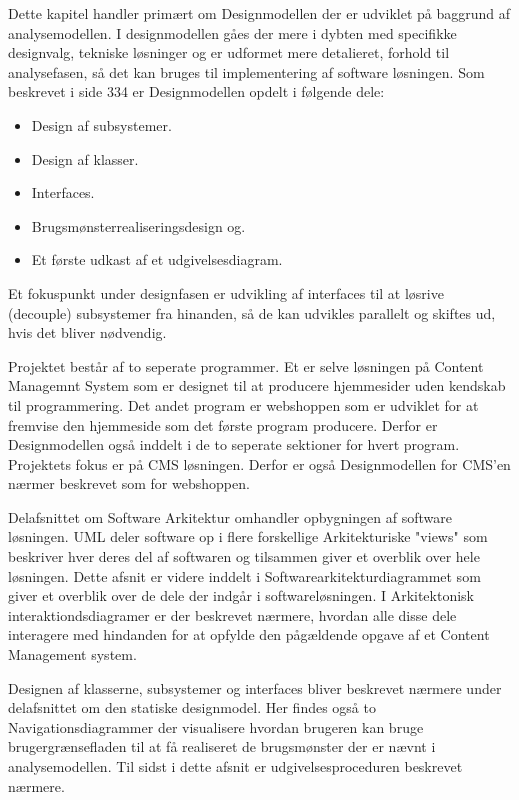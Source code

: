 Dette kapitel handler primært om Designmodellen der er udviklet på baggrund af analysemodellen. I designmodellen gåes der mere i dybten med specifikke designvalg, tekniske løsninger og er udformet mere detalieret, forhold til analysefasen, så det kan bruges til implementering af software løsningen. Som beskrevet i \cite{A&N} side 334 er Designmodellen opdelt i følgende dele:
\begin{itemize}
\item Design af subsystemer.
\item Design af klasser.
\item Interfaces.
\item Brugsmønsterrealiseringsdesign og.
\item Et første udkast af et udgivelsesdiagram.
\end{itemize}
Et fokuspunkt under designfasen er udvikling af interfaces til at løsrive (decouple) subsystemer fra hinanden, så de kan udvikles parallelt og skiftes ud, hvis det bliver nødvendig. 

Projektet består af to seperate programmer. Et er selve løsningen på Content Managemnt System som er designet til at producere hjemmesider uden kendskab til programmering. Det andet program er webshoppen som er udviklet for at fremvise den hjemmeside som det første program producere. Derfor er Designmodellen også inddelt i de to seperate sektioner for hvert program. Projektets fokus er på CMS løsningen. Derfor er også Designmodellen for CMS'en nærmer beskrevet som for webshoppen.

Delafsnittet om Software Arkitektur omhandler opbygningen af software løsningen. UML deler software op i flere forskellige Arkitekturiske "views" som beskriver hver deres del af softwaren og tilsammen giver et overblik over hele løsningen. Dette afsnit er videre inddelt i Softwarearkitekturdiagrammet som giver et overblik over de dele der indgår i softwareløsningen. I Arkitektonisk interaktiondsdiagramer er der beskrevet nærmere, hvordan alle disse dele interagere med hindanden for at opfylde den pågældende opgave af et Content Management system.

Designen af klasserne, subsystemer og interfaces bliver beskrevet nærmere under delafsnittet om den statiske designmodel. Her findes også to Navigationsdiagrammer der visualisere hvordan brugeren kan bruge brugergrænsefladen til at få realiseret de brugsmønster der er nævnt i analysemodellen. Til sidst i dette afsnit er udgivelsesproceduren beskrevet nærmere.

\clearpage
